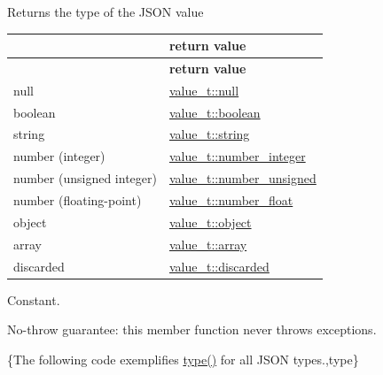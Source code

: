 \begin{DoxyReturn}{Returns}
the type of the J\+S\+ON value \tabulinesep=1mm
\begin{longtabu} spread 0pt [c]{*2{|X[-1]}|}
\hline
{}&{\bf return value  }\\
\endfirsthead
\hline
\endfoot
\hline
{}&{\bf return value  }\\
\endhead
null &\hyperlink{namespacenlohmann_1_1detail_a1ed8fc6239da25abcaf681d30ace4985a37a6259cc0c1dae299a7866489dff0bd}{value\+\_\+t\+::null} \\
boolean &\hyperlink{namespacenlohmann_1_1detail_a1ed8fc6239da25abcaf681d30ace4985a84e2c64f38f78ba3ea5c905ab5a2da27}{value\+\_\+t\+::boolean} \\
string &\hyperlink{namespacenlohmann_1_1detail_a1ed8fc6239da25abcaf681d30ace4985ab45cffe084dd3d20d928bee85e7b0f21}{value\+\_\+t\+::string} \\
number (integer) &\hyperlink{namespacenlohmann_1_1detail_a1ed8fc6239da25abcaf681d30ace4985a5763da164f8659d94a56e29df64b4bcc}{value\+\_\+t\+::number\+\_\+integer} \\
number (unsigned integer) &\hyperlink{namespacenlohmann_1_1detail_a1ed8fc6239da25abcaf681d30ace4985adce7cc8ec29055c4158828921f2f265e}{value\+\_\+t\+::number\+\_\+unsigned} \\
number (floating-\/point) &\hyperlink{namespacenlohmann_1_1detail_a1ed8fc6239da25abcaf681d30ace4985ad9966ecb59667235a57b4b999a649eef}{value\+\_\+t\+::number\+\_\+float} \\
object &\hyperlink{namespacenlohmann_1_1detail_a1ed8fc6239da25abcaf681d30ace4985aa8cfde6331bd59eb2ac96f8911c4b666}{value\+\_\+t\+::object} \\
array &\hyperlink{namespacenlohmann_1_1detail_a1ed8fc6239da25abcaf681d30ace4985af1f713c9e000f5d3f280adbd124df4f5}{value\+\_\+t\+::array} \\
discarded &\hyperlink{namespacenlohmann_1_1detail_a1ed8fc6239da25abcaf681d30ace4985a94708897ec9db8647dfe695714c98e46}{value\+\_\+t\+::discarded} \\
\end{longtabu}
Constant.
\end{DoxyReturn}
No-\/throw guarantee\+: this member function never throws exceptions.

\{The following code exemplifies {\ttfamily \hyperlink{classnlohmann_1_1basic__json_a2b2d781d7f2a4ee41bc0016e931cadf7}{type()}} for all J\+S\+ON types.,type\}

